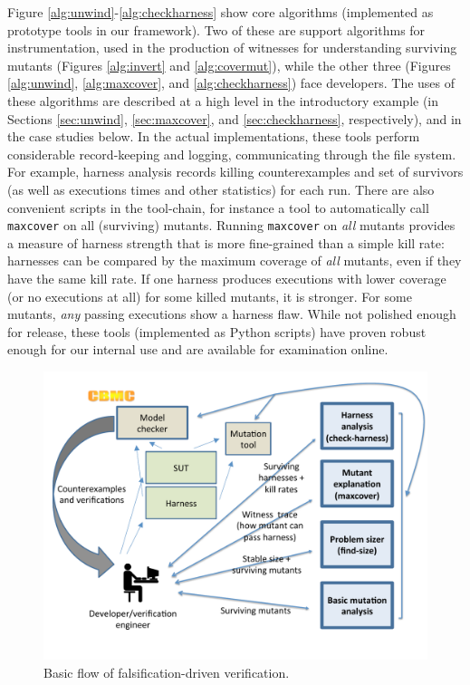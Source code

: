 \documentclass[conference]{IEEEtran}
\begin{document}
Figure \ref{alg:unwind}-\ref{alg:checkharness} show core algorithms
(implemented as prototype tools in our framework).  Two of these are
support algorithms for instrumentation, used in the production of
witnesses for understanding surviving mutants (Figures
\ref{alg:invert} and \ref{alg:covermut}), while the other three
(Figures \ref{alg:unwind}, \ref{alg:maxcover}, and
\ref{alg:checkharness}) face developers.  The uses of these algorithms
are described at a high level in the introductory example (in Sections
\ref{sec:unwind}, \ref{sec:maxcover}, and \ref{sec:checkharness},
respectively), and in the case studies below.  In the actual
implementations, these tools perform considerable record-keeping and
logging, communicating through the file system.  For example, harness
analysis records killing counterexamples and set of survivors (as well
as executions times and other statistics) for each run.  There are
also convenient scripts in the tool-chain, for instance a tool to
automatically call {\tt maxcover} on all (surviving) mutants.  Running
{\tt maxcover} on \emph{all} mutants provides a measure of harness
strength that is more fine-grained than a simple kill rate: harnesses
can be compared by the maximum coverage of \emph{all} mutants, even if
they have the same kill rate.  If one harness produces executions with
lower coverage (or no executions at all) for some killed mutants, it
is stronger.  For some mutants, \emph{any} passing executions show a harness
flaw. While not polished enough for release, these tools (implemented
as Python scripts) have proven robust enough for our internal use and
are available for examination online.

\begin{figure}
\includegraphics[width=\columnwidth]{TestFlow}
\caption{Basic flow of falsification-driven verification.}
\label{fig:flow}
\end{figure}
\end{document}
